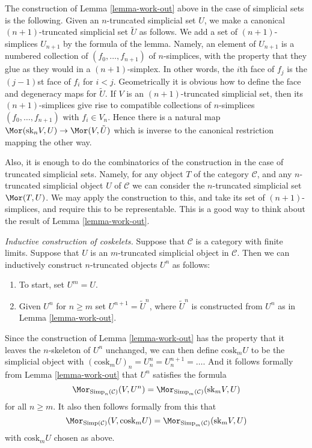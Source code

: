 \begin{remark}
\label{remark-cosk-simplicial-sets}
The construction of Lemma \ref{lemma-work-out}
above in the case of simplicial
sets is the following. Given an $n$-truncated simplicial
set $U$, we make a canonical $(n + 1)$-truncated simplicial
set $\tilde U$ as follows. We add a set of $(n + 1)$-simplices
$U_{n + 1}$ by the formula of the lemma. Namely,
an element of $U_{n + 1}$ is a numbered collection of
$(f_0, \ldots, f_{n + 1})$ of $n$-simplices,
with the property that they glue
as they would in a $(n + 1)$-simplex. In other words,
the $i$th face of $f_j$ is the $(j-1)$st face of $f_i$
for $i < j$. Geometrically it is obvious how to define the
face and degeneracy maps for $\tilde U$.
If $V$ is an $(n + 1)$-truncated simplicial set,
then its $(n + 1)$-simplices give rise to compatible collections
of $n$-simplices $(f_0, \ldots, f_{n + 1})$ with $f_i \in V_n$.
Hence there is a natural map
$\Mor(\text{sk}_nV, U) \to \Mor(V, \tilde U)$
which is inverse to the canonical restriction mapping
the other way.

\medskip\noindent
Also, it is enough to do the combinatorics of the
construction in the case of truncated simplicial sets.
Namely, for any object $T$ of the category $\mathcal{C}$,
and any $n$-truncated simplicial object $U$ of $\mathcal{C}$
we can consider the $n$-truncated simplicial set
$\Mor(T, U)$. We may apply the construction to this,
and take its set of $(n + 1)$-simplices, and require this to be
representable. This is a good way to think about
the result of Lemma \ref{lemma-work-out}.
\end{remark}

\begin{remark}
\label{remark-inductive-coskelet}
{\it Inductive construction of coskelets.}
Suppose that $\mathcal{C}$ is a category with
finite limits. Suppose that $U$ is an $m$-truncated
simplicial object in $\mathcal{C}$. Then we can
inductively construct $n$-truncated objects $U^n$ as
follows:
\begin{enumerate}
\item To start, set $U^m = U$.
\item Given $U^n$ for $n \geq m$ set $U^{n + 1} = \tilde U^n$,
where $\tilde U^n$ is constructed from $U^n$ as in Lemma
\ref{lemma-work-out}.
\end{enumerate}
Since the construction of Lemma \ref{lemma-work-out} has
the property that it leaves the $n$-skeleton of $U^n$
unchanged, we can then define $\text{cosk}_m U$ to be
the simplicial object with
$(\text{cosk}_m U)_n = U^n_n = U^{n + 1}_n = \ldots$.
And it follows formally from Lemma \ref{lemma-work-out}
that $U^n$ satisfies the formula
$$
\Mor_{\text{Simp}_n(\mathcal{C})}(V, U^n)
=
\Mor_{\text{Simp}_m(\mathcal{C})}(\text{sk}_mV, U)
$$
for all $n \geq m$. It also then follows formally
from this that
$$
\Mor_{\text{Simp}(\mathcal{C})}(V, \text{cosk}_mU)
=
\Mor_{\text{Simp}_m(\mathcal{C})}(\text{sk}_mV, U)
$$
with $\text{cosk}_mU$ chosen as above.
\end{remark}

